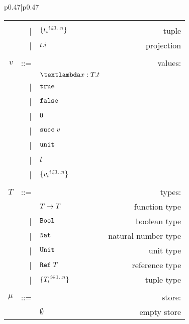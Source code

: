 \begin{figure}[h]
\begin{tabular}{p{}|p{}}
\begin{tabular}{r@{\hspace{0.5em}}r@{\hspace{0.5em}}l@{\hspace{0.5em}}r}
            &     &                             &                     \\
            & |   & $\{{t_i}^{i\in 1..n}\}$ & tuple               \\
            & |   & $t.i$               & projection          \\
            &     &                             &                     \\
        $v$ & ::= &                             & values:             \\
            &     & $\tyabs{x}{T}{t}$           &                     \\
            & |   & $\texttt{true}$                     &                     \\
            & |   & $\texttt{false}$                    &                     \\
            & |   & $0$                     &                     \\
            & |   & $\texttt{succ\;}v$                 &                     \\
            & |   & $\texttt{unit}$                     &                     \\
            & |   & $l$                         &                     \\
            & |   & $\{{v_i}^{i\in 1..n}\}$ &                     \\
            &     &                             &                     \\
        $T$ & ::= &                             & types:              \\
            &     & $T \rightarrow T$                & function type       \\
            & |   & $\texttt{Bool}$                     & boolean type        \\
            & |   & $\texttt{Nat}$                      & natural number type \\
            & |   & $\texttt{Unit}$                     & unit type           \\
            & |   & $\texttt{Ref\;}T$                   & reference type      \\
            & |   & $\{{T_i}^{i\in 1..n}\}$ & tuple type          \\
            &     &                             &                     \\
      $\mu$ & ::= &                             & store:              \\
            &     & $\emptyset$                 & empty store         \\

\end{tabular}
\end{tabular}
\end{figure}
